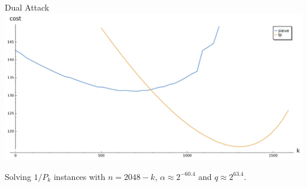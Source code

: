 \documentclass[presentation,smaller]{beamer}
\begin{document}
\begin{frame}[label={sec:orgheadline53}]{Dual Attack}
\includegraphics[width=1.0\textwidth]{sparse.png}


\begin{center}
Solving \(1/P_k\) instances with \(n=2048-k\), \(α≈2^{-60.4}\) and \(q≈2^{63.4}\).
\end{center}
\end{frame}
\end{document}
